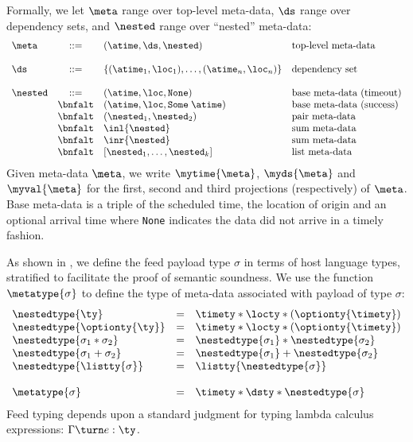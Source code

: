 Formally, we let 
$\meta$ range over top-level meta-data,
$\ds$ range over dependency sets, and 
$\nested$ range over ``nested'' meta-data:
\[
\begin{array}{lcll} 
\meta & ::= & (\atime,\ds,\nested) & \mbox{top-level meta-data} \\  
\\
\ds   & ::= & \{(\atime_1,\loc_1),\ldots,(\atime_n, \loc_n) \}  & \mbox{dependency set}\\ 
\\
\nested & ::=     
          & (\atime,\loc,\mathtt{None}) & \mbox{base meta-data (timeout)} \\
& \bnfalt & (\atime,\loc,\mathtt{Some}\; \atime) & \mbox{base meta-data (success)} \\
& \bnfalt & (\nested_1,\nested_2) & \mbox{pair meta-data} \\
& \bnfalt & \inl{\nested} & \mbox{sum meta-data} \\
& \bnfalt & \inr{\nested} & \mbox{sum meta-data} \\
& \bnfalt & [\nested_1,\ldots,\nested_k] & \mbox{list meta-data} \\
\end{array}
\] 
Given meta-data $\meta$, we write $\mytime{\meta}$, $\myds{\meta}$ and
$\myval{\meta}$ for the first, second and third projections (respectively) of $\meta$.
Base meta-data is a triple of the scheduled time, the location of origin 
and an optional arrival time where {\tt None} indicates the data did not arrive
in a timely fashion.

As shown in , we define the feed payload type
$\sigma$ in terms of host 
language types, stratified to facilitate the proof of
semantic soundness.  
We use the function $\metatype{\sigma}$ to define the type of
meta-data associated with payload of type $\sigma$:
\[
\begin {array} {lcl}
\nestedtype{\ty} & = & \timety * \locty * (\optionty{\timety}) \\
\nestedtype{\optionty{\ty}} & = & \timety * \locty * (\optionty{\timety}) \\
\nestedtype{\sigma_1 * \sigma_2} & = & \nestedtype{\sigma_1} * \nestedtype{\sigma_2} \\
\nestedtype{\sigma_1 + \sigma_2} & = & \nestedtype{\sigma_1} + \nestedtype{\sigma_2} \\
\nestedtype{\listty{\sigma}} & = & \listty{\nestedtype{\sigma}} \\
\\
\metatype{\sigma} & = & \timety * \dsty * \nestedtype{\sigma} \\
\end{array}
\]
Feed typing depends upon a standard judgment for
typing lambda calculus expressions: $\Gamma \turn e : \ty$.  

